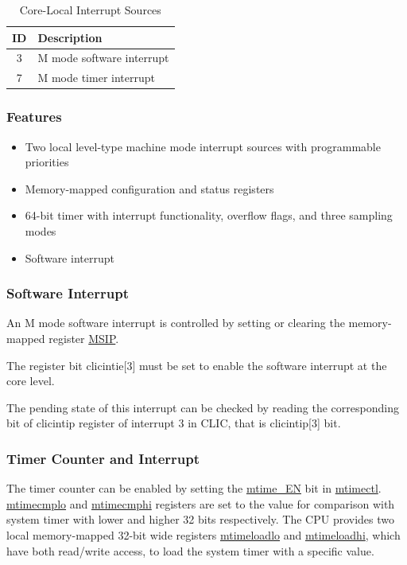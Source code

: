 \documentclass[main\_\_EN.tex]{subfiles}
\begin{document}
\begin{longtable}{ | c | l | }
\caption{Core-Local Interrupt Sources} \label{tab:riscvcpu-clint-table}
\\ \hline
\rowcolor{lightgray}
ID & Description \\ \hline
3 & M mode software interrupt \\ \hline
7 & M mode timer interrupt \\ \hline
\end{longtable}


\subsubsection{Features}
\begin{itemize}
    \item Two local level-type machine mode interrupt sources with programmable priorities
    \item Memory-mapped configuration and status registers
    \item 64-bit timer with interrupt functionality, overflow flags, and three sampling modes
    \item Software interrupt
\end{itemize}

\subsubsection{Software Interrupt}
\label{sec:riscvcpu-clint-software}

An M mode software interrupt is controlled by setting or clearing the memory-mapped register \hyperref[regdesc:CLINTMSIPREG]{MSIP}.

The register bit clicintie[3] must be set to enable the software interrupt at the core level.

The pending state of this interrupt can be checked by reading the corresponding bit of clicintip register of interrupt 3 in CLIC, that is clicintip[3] bit.


\subsubsection{Timer Counter and Interrupt}
\label{sec:riscvcpu-clint-timer}

The timer counter can be enabled by setting the \hyperref[fielddesc:CLINTMTIMECTLEN]{mtime\_EN} bit in  \hyperref[regdesc:CLINTMTIMECTLREG]{mtimectl}.
\hyperref[regdesc:CLINTMTIMECMPLOREG]{mtimecmplo} and \hyperref[regdesc:CLINTMTIMECMPHIREG]{mtimecmphi} registers are set to the value for comparison with system timer with lower and higher 32 bits respectively.
The CPU provides two local memory-mapped 32-bit wide registers \hyperref[regdesc:CLINTMTIMELOADLOREG]{mtimeloadlo} and \hyperref[regdesc:CLINTMTIMELOADHIREG]{mtimeloadhi}, which have both read/write access, to load the system timer with a specific value.
\end{document}
